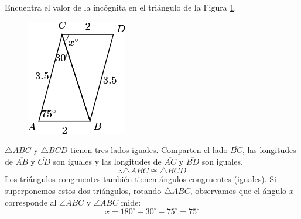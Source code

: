 Encuentra el valor de la incógnita en el triángulo de la Figura \ref{fig:angle_triangle_18}.

\begin{minipage}[t][5cm][b]{0.3\textwidth}
    \begin{figure}[H]
        \centering
        \includegraphics[width=0.7\linewidth]{../images/angle_triangle_18.png}
        \caption{}
        \label{fig:angle_triangle_18}
    \end{figure}
\end{minipage}\hfill
\begin{minipage}[t]{0.65\textwidth}
    \begin{solutionbox}{5cm}
        $\triangle ABC$ y $\triangle BCD$ tienen tres lados iguales. Comparten el lado
        $\overline{BC}$, las longitudes de $\overline{AB}$ y $\overline{CD}$ son iguales y las longitudes de
        $\overline{AC}$ y $\overline{BD}$ son iguales.
        \[\therefore \triangle ABC \cong \triangle BCD\]
        Los triángulos congruentes también tienen ángulos congruentes (iguales). Si superponemos estos dos triángulos, rotando
        $\triangle ABC$, observamos que el ángulo $x$ corresponde al
        $\angle ABC$ y $\angle ABC$ mide:
        \[x=180^\circ-30^\circ-75^\circ=75^\circ\]
    \end{solutionbox}
\end{minipage}
